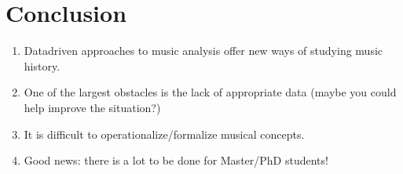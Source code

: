 \documentclass[letterpaper,10pt,english]{sphinxmanual}
\begin{document}
\begin{enumerate}
\begin{enumerate}
\begin{enumerate}
\begin{enumerate}
\begin{enumerate}
\begin{enumerate}
\begin{enumerate}
\begin{enumerate}
\end{enumerate}

\end{enumerate}

\end{enumerate}

\end{enumerate}

\end{enumerate}

\end{enumerate}

\end{enumerate}

\end{enumerate}


\section{Conclusion}
\label{\detokenize{data-driven_music_history:conclusion}}\begin{enumerate}
%
\item {} 
Data\sphinxhyphen{}driven approaches to music analysis offer new ways of studying
music history.

\item {} 
One of the largest obstacles is the lack of appropriate data (maybe
you could help improve the situation?)

\item {} 
It is difficult to operationalize/formalize musical concepts.

\item {} 
Good news: there is a lot to be done for Master/PhD students!

\end{enumerate}
\end{document}

